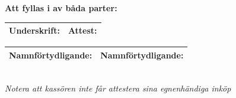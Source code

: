 \documentclass[7pt,a4paper]{article}
\newcommand{\signbox}[3]{

\vspace{2cm}
#1  \\
\vspace{5mm}\\
\line(1,0){150}\\
 #2 \\ #3\newpage}
\begin{document}

\textbf{Att fyllas i av båda parter:} \\

\begin{tabular}{|p{8cm}|p{8cm}|}
\hline
Underskrift: & Attest: \\ \hline
\end{tabular}

\begin{tabular}{|p{8cm}|p{8cm}|}
Namnförtydligande: & Namnförtydligande:  \\ \hline
\end{tabular}\\

\textit{Notera att kassören inte får attestera sina egnenhändiga inköp} \\


\end{document}
